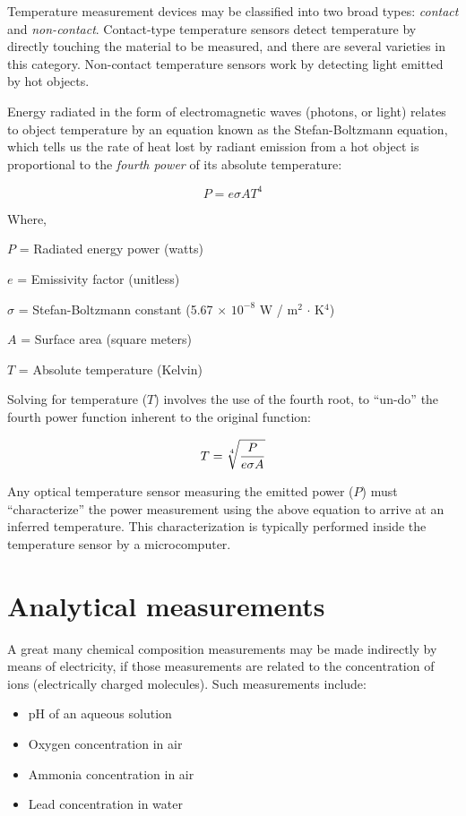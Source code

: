 Temperature measurement devices may be classified into two broad types: \textit{contact} and \textit{non-contact}.  Contact-type temperature sensors detect temperature by directly touching the material to be measured, and there are several varieties in this category.  Non-contact temperature sensors work by detecting light emitted by hot objects.

Energy radiated in the form of electromagnetic waves (photons, or light) relates to object temperature by an equation known as the Stefan-Boltzmann equation, which tells us the rate of heat lost by radiant emission from a hot object is proportional to the \textit{fourth power} of its absolute temperature: 

$$P = e \sigma A T^4$$

\noindent
Where,

$P$ = Radiated energy power (watts)

$e$ = Emissivity factor (unitless)

$\sigma$ = Stefan-Boltzmann constant (5.67 $\times$ $10^{-8}$ W / m$^{2}$ $\cdot$ K$^{4}$)

$A$ = Surface area (square meters)

$T$ = Absolute temperature (Kelvin)

\vskip 10pt

Solving for temperature ($T$) involves the use of the fourth root, to ``un-do'' the fourth power function inherent to the original function:

$$T = \root 4 \of {P \over {e \sigma A}}$$

Any optical temperature sensor measuring the emitted power ($P$) must ``characterize'' the power measurement using the above equation to arrive at an inferred temperature.  This characterization is typically performed inside the temperature sensor by a microcomputer.






\filbreak
\section{Analytical measurements}

A great many chemical composition measurements may be made indirectly by means of electricity, if those measurements are related to the concentration of ions (electrically charged molecules).  Such measurements include:

\begin{itemize}
\item pH of an aqueous solution
\item Oxygen concentration in air
\item Ammonia concentration in air
\item Lead concentration in water
\end{itemize}

